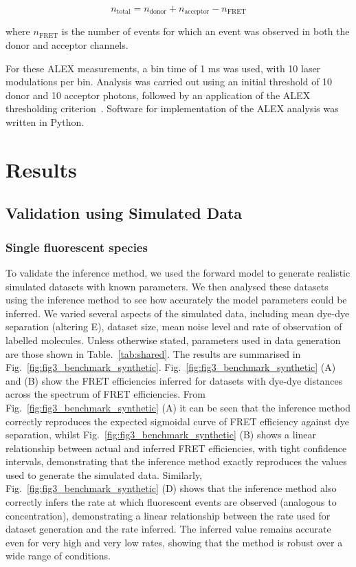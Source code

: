 \begin{equation}
n_{\text{total}} = n_{\text{donor}} + n_{\text{acceptor}} - n_{\text{FRET}}
\label{eq:total_events}
\end{equation}

where $n_{\text{FRET}}$ is the number of events for which an event was observed in both the donor and acceptor channels. 

For these ALEX measurements, a bin time of 1 ms was used, with 10 laser modulations per bin. Analysis was carried out using an initial threshold of 10 donor and 10 acceptor photons, followed by an application of the ALEX thresholding criterion~\cite{kapanidis05}. Software for implementation of the ALEX analysis was written in Python.


\section{Results}
\subsection*{Validation using Simulated Data}
\subsubsection*{Single fluorescent species}


To validate the inference method, we used the forward model to generate realistic simulated datasets with known parameters.  We then analysed these datasets using the inference method to see how accurately the model parameters could be inferred. We varied several aspects of the simulated data, including mean dye-dye separation (altering E), dataset size, mean noise level and rate of observation of labelled molecules.  Unless otherwise stated, parameters used in data generation are those shown in Table.~\ref{tab:shared}. The results are summarised in Fig.~\ref{fig:fig3_benchmark_synthetic}.  Fig.~\ref{fig:fig3_benchmark_synthetic} (A) and (B) show the FRET efficiencies inferred for datasets with dye-dye distances across the spectrum of FRET efficiencies.  From Fig.~\ref{fig:fig3_benchmark_synthetic} (A) it can be seen that the inference method correctly reproduces the expected sigmoidal curve of FRET efficiency against dye separation, whilst Fig.~\ref{fig:fig3_benchmark_synthetic} (B) shows a linear relationship between actual and inferred FRET efficiencies, with tight confidence intervals, demonstrating that the inference method exactly reproduces the values used to generate the simulated data.  Similarly, Fig.~\ref{fig:fig3_benchmark_synthetic} (D) shows that the inference method also correctly infers the rate at which fluorescent events are observed (analogous to concentration), demonstrating a linear relationship between the rate used for dataset generation and the rate inferred.  The inferred value remains accurate even for very high and very low rates, showing that the method is robust over a wide range of conditions. 

